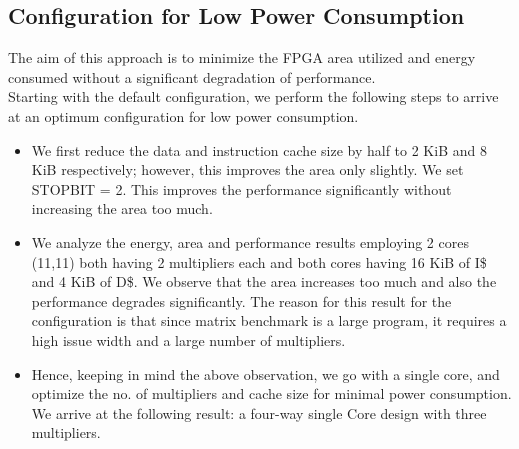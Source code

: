 \documentclass[conference]{IEEEtran}
\begin{document}
\subsection{Configuration for Low Power Consumption}

The aim of this approach is to minimize the FPGA area utilized and energy consumed without a significant degradation of performance.\\
Starting with the default configuration, we perform the following steps to arrive at an optimum configuration for low power consumption.
\begin{itemize}
    \item We first reduce the data and instruction cache size by half to 2 KiB and 8 KiB respectively; however, this improves the area only slightly. We set STOPBIT = 2. This improves the performance significantly without increasing the area too much.
    \item We analyze the energy, area and performance results employing 2 cores (11,11) both having 2 multipliers each and both cores having 16 KiB of I\$ and 4 KiB of D\$. We observe that the area increases too much and also the performance degrades significantly. The reason for this result for the configuration is that since matrix benchmark is a large program, it requires a high issue width and a large number of multipliers.
    \item Hence, keeping in mind the above observation, we go with a single core, and optimize the no. of multipliers and cache size for minimal power consumption. We arrive at the following result: a four-way single Core design with three multipliers.

\end{itemize}
\end{document}
